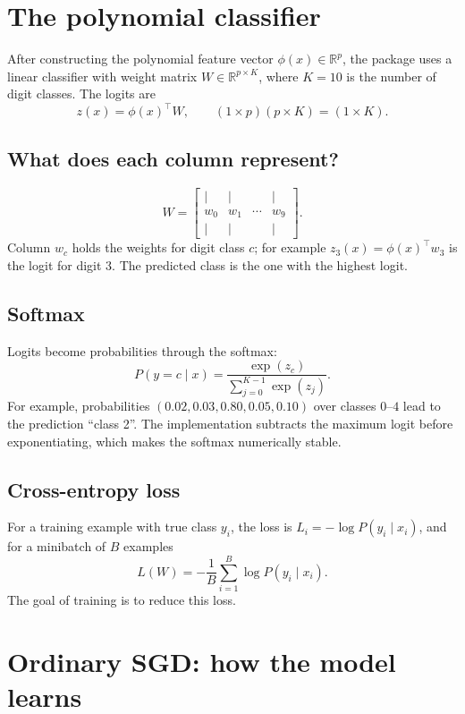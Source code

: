 \documentclass[11pt,a4paper]{article}
\newcommand{\R}{\mathbb{R}}
\begin{document}
\section{The polynomial classifier}

After constructing the polynomial feature vector $\phi(x)\in\R^p$, the package uses a linear classifier with weight matrix $W\in\R^{p\times K}$, where $K=10$ is the number of digit classes. The logits are
\[
z(x)=\phi(x)^\top W,
\qquad (1\times p)(p\times K)=(1\times K).
\]

\subsection{What does each column represent?}

\[
W=\begin{bmatrix}|&|&&|\\ w_0&w_1&\cdots&w_9\\ |&|&&|\end{bmatrix}.
\]
Column $w_c$ holds the weights for digit class $c$; for example $z_3(x)=\phi(x)^\top w_3$ is the logit for digit 3. The predicted class is the one with the highest logit.

\subsection{Softmax}

Logits become probabilities through the softmax:
\[
P(y=c\mid x)=\frac{\exp(z_c)}{\sum_{j=0}^{K-1}\exp(z_j)}.
\]
For example, probabilities $(0.02,0.03,0.80,0.05,0.10)$ over classes $0$--$4$ lead to the prediction ``class 2''. The implementation subtracts the maximum logit before exponentiating, which makes the softmax numerically stable.

\subsection{Cross-entropy loss}

For a training example with true class $y_i$, the loss is $L_i=-\log P(y_i\mid x_i)$, and for a minibatch of $B$ examples
\[
L(W)=-\frac1B\sum_{i=1}^{B}\log P(y_i\mid x_i).
\]
The goal of training is to reduce this loss.

\section{Ordinary SGD: how the model learns}
\end{document}
